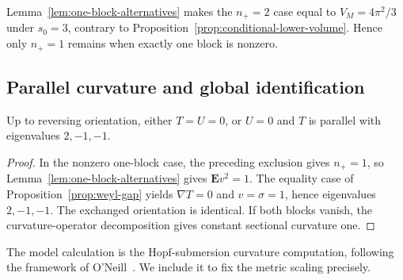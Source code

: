 Lemma~\ref{lem:one-block-alternatives} makes the $n_+=2$ case equal to
$V_M=4\pi^2/3$ under $s_0=3$, contrary to
Proposition~\ref{prop:conditional-lower-volume}. Hence only $n_+=1$
remains when exactly one block is nonzero.

\subsection{Parallel curvature and global identification}

\begin{proposition}\label{prop:parallel-models}
Up to reversing orientation, either $T=U=0$, or $U=0$ and $T$ is parallel
with eigenvalues $2,-1,-1$.
\end{proposition}
\begin{proof}
In the nonzero one-block case, the preceding exclusion gives $n_+=1$,
so Lemma~\ref{lem:one-block-alternatives} gives $\mathbf E v^2=1$.
The equality case of Proposition~\ref{prop:weyl-gap} yields
$\nabla T=0$ and $v=\sigma=1$, hence eigenvalues $2,-1,-1$.
The exchanged orientation is identical. If both blocks vanish, the
curvature-operator decomposition gives constant sectional curvature one.
\end{proof}

The model calculation is the Hopf-submersion curvature computation,
following the framework of O'Neill~\cite{ONeill1966}. We include it to
fix the metric scaling precisely.

